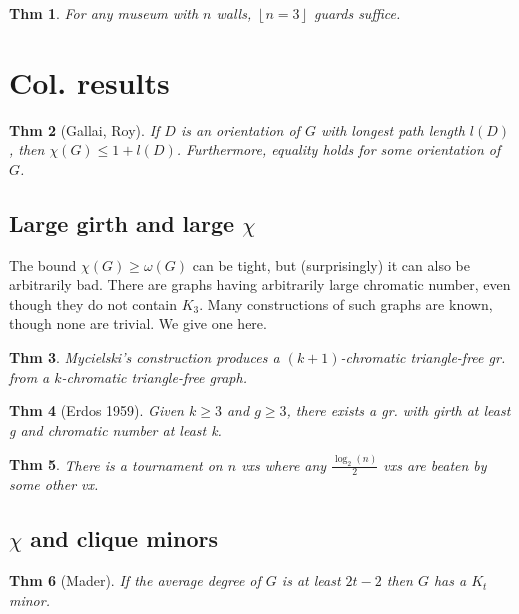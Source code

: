 \documentclass[11pt, fleqn, a4paper, landscape]{article}
\theoremstyle{plain} %
\newtheorem{thm}{Thm}
\theoremstyle{remark} %
\theoremstyle{definition} %
\newtheorem{defi}[thm]{Def}
\begin{document}
\begin{multicols}{5}
\begin{thm}
For any museum with $n$ walls, $\left\lfloor n=3\right\rfloor$ guards suffice.
\end{thm}

\section{Col. results}
\begin{thm}[Gallai, Roy]
If $D$ is an orientation of $G$ with longest path length $l(D)$, then $\chi(G) \le 1 + l(D)$. Furthermore, equality holds for some orientation of $G$.
\end{thm} 

\subsection{Large girth and large $\chi$}

The bound $\chi(G) \ge \omega(G)$ can be tight, but (surprisingly) it can also be arbitrarily bad. There are graphs having arbitrarily large chromatic number, even though they do not contain $K_3$. Many constructions of such graphs are known, though none are trivial. We give one here.
\addtocounter{thm}{1}
\begin{thm}
Mycielski’s construction produces a $(k + 1)$-chromatic triangle-free gr. from a $k$-chromatic triangle-free graph.
\end{thm}

\addtocounter{thm}{1}
\begin{thm}[Erdos 1959]
Given $k \ge 3$ and $g \ge 3$, there exists a gr. with girth at least g and
chromatic number at least k.
\end{thm} 
\addtocounter{thm}{2}
\begin{thm}
There is a tournament on $n$ vxs where any $\frac{\log_2(n)}{2}$ vxs are beaten by some other vx.
\end{thm}
\subsection{$\chi$ and clique minors}
%
\addtocounter{thm}{3}
\begin{thm}[Mader]
If the average degree of $G$ is at least $2t-2$ then $G$ has a $K_t$ minor.
\end{thm}


\end{multicols}
\end{document}
